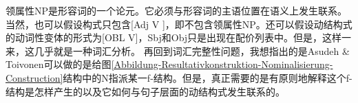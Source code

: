 领属性NP是形容词的一个论元。它必须与形容词的主语位置在语义上发生联系。当然，也可以假设构式只包含[Adj V ]，即不包含领属性NP。还可以假设动结构式的动词性变体的形式为[OBL V]，Sbj和Obj只是出现在配价列表中。但是，这样一来，这几乎就是一种词汇分析。
    再回到词汇完整性问题，我想指出的是Asudeh \& Toivonen可以做的是给图\ref{Abbildung-Resultativkonstruktion-Nominalisierung-Construction}结构中的N指派某一f-结构。但是，真正需要的是有原则地解释这个f-结构是怎样产生的以及它如何与句子层面的动结构式发生联系的。

